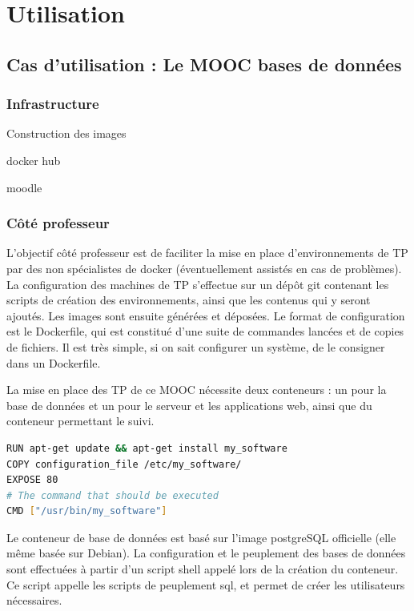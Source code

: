 \documentclass[a4paper,11pt]{report}
\begin{document}
\pagestyle{fancy}

\chapter{Utilisation}

\pagestyle{fancy}

\section{Cas d'utilisation : Le MOOC bases de données}

\subsection{Infrastructure}

Construction des images

docker hub

moodle

\subsection{Côté professeur}

L'objectif côté professeur est de faciliter la mise en place d'environnements de TP par des non spécialistes de docker (éventuellement assistés en cas de problèmes).
La configuration des machines de TP s'effectue sur un dépôt git contenant les scripts de création des environnements, ainsi que les contenus qui y seront ajoutés. Les images sont ensuite générées et déposées.
Le format de configuration est le Dockerfile, qui est constitué d'une suite de commandes lancées et de copies de fichiers. Il est très simple, si on sait configurer un système, de le consigner dans un Dockerfile.

La mise en place des TP de ce MOOC nécessite deux conteneurs : un pour la base de données et un pour le serveur et les applications web, ainsi que du conteneur permettant le suivi.

\begin{lstlisting}[language=Bash,caption={Dockerfile de base}]
RUN apt-get update && apt-get install my_software
COPY configuration_file /etc/my_software/
EXPOSE 80
# The command that should be executed
CMD ["/usr/bin/my_software"]
\end{lstlisting}

Le conteneur de base de données est basé sur l'image postgreSQL officielle (elle même basée
sur Debian). La configuration et le peuplement des bases de données sont effectuées à partir d'un script shell appelé lors de la création du conteneur. Ce script appelle les scripts de peuplement sql, et permet de créer les utilisateurs nécessaires.
\end{document}
